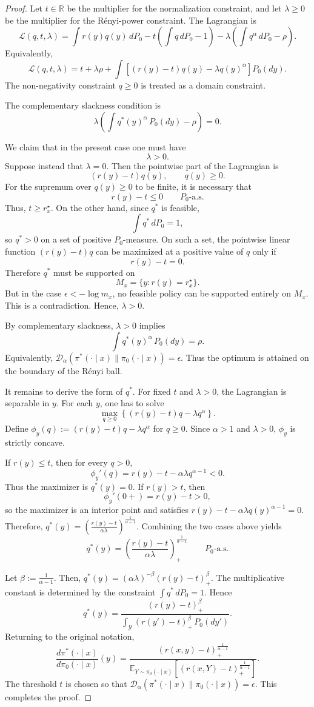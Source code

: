 \documentclass[11pt]{article}
\begin{document}
\begin{proof}
Let $t\in\mathbb R$ be the multiplier for
the normalization constraint, and let $\lambda\ge0$ be the multiplier for the
R\'enyi-power constraint. The Lagrangian is
\[
\mathcal L(q,t,\lambda)
=
\int r(y)q(y)\,dP_0
-
t\left(\int q\,dP_0-1\right)
-
\lambda\left(\int q^\alpha\,dP_0-\rho\right).
\]
Equivalently,
\[
\mathcal L(q,t,\lambda)
=
t+\lambda\rho
+
\int
\left[
(r(y)-t)q(y)-\lambda q(y)^\alpha
\right]P_0(dy).
\]
The non-negativity constraint $q\ge0$ is treated as a domain constraint.

The complementary slackness condition is
\[
\lambda
\left(
\int q^*(y)^\alpha\,P_0(dy)-\rho
\right)
=
0.
\]

We claim that in the present case one must have
\[
\lambda>0.
\]
Suppose instead that $\lambda=0$. Then the pointwise part of the Lagrangian is
\[
(r(y)-t)q(y),
\qquad q(y)\ge0.
\]
For the supremum over $q(y)\ge0$ to be finite, it is necessary that
\[
r(y)-t\le0
\qquad P_0\text{-a.s.}
\]
Thus, $t\ge r_x^\star$. On the other hand, since $q^*$ is feasible,
\[
\int q^*\,dP_0=1,
\]
so $q^*>0$ on a set of positive $P_0$-measure. On such a set, the pointwise
linear function $(r(y)-t)q$ can be maximized at a positive value of $q$ only if
\[
r(y)-t=0.
\]
Therefore $q^*$ must be supported on
\[
M_x=\{y:r(y)=r_x^\star\}.
\]
But in the case $\epsilon<-\log m_x$, no feasible policy can be supported
entirely on $M_x$. This is a contradiction. Hence, $\lambda>0$.

By complementary slackness, $\lambda>0$ implies
\[
\int q^*(y)^\alpha\,P_0(dy)=\rho.
\]
Equivalently, $\mathcal D_\alpha(\pi^*(\cdot\mid x)\|\pi_0(\cdot\mid x))
=
\epsilon$. Thus the optimum is attained on the boundary of the R\'enyi ball.

It remains to derive the form of $q^*$. For fixed $t$ and $\lambda>0$, the
Lagrangian is separable in $y$. For each $y$, one has to solve
\[
\max_{q\ge0}
\left\{
(r(y)-t)q-\lambda q^\alpha
\right\}.
\]
Define
$
\phi_y(q):=(r(y)-t)q-\lambda q^\alpha$ for $q\ge0$. Since $\alpha>1$ and $\lambda>0$, $\phi_y$ is strictly concave.

If $r(y)\le t$, then for every $q>0$,
\[
\phi_y'(q)
=
r(y)-t-\alpha\lambda q^{\alpha-1}
<0.
\]
Thus the maximizer is $
q^*(y)=0$. If $r(y)>t$, then
\[
\phi_y'(0+)=r(y)-t>0,
\]
so the maximizer is an interior point and satisfies
$
r(y)-t-\alpha\lambda q(y)^{\alpha-1}=0$. Therefore, $q^*(y)
=
\left(
\frac{r(y)-t}{\alpha\lambda}
\right)^{\frac1{\alpha-1}}$. Combining the two cases above yields
\[
q^*(y)
=
\left(
\frac{r(y)-t}{\alpha\lambda}
\right)_+^{\frac1{\alpha-1}}
\qquad P_0\text{-a.s.}
\]

Let $\beta:=\frac1{\alpha-1}$. Then,
$
q^*(y)
=
(\alpha\lambda)^{-\beta}(r(y)-t)_+^\beta$. The multiplicative constant is determined by the constraint $\int q^*\,dP_0=1$. Hence
\[
q^*(y)
=
\frac{(r(y)-t)_+^\beta}
{\int_{\mathcal Y}(r(y')-t)_+^\beta\,P_0(dy')}.
\]
Returning to the original notation,
\[
\frac{d\pi^*(\cdot\mid x)}{d\pi_0(\cdot\mid x)}(y)
=
\frac{(r(x,y)-t)_+^{\frac1{\alpha-1}}}
{\mathbb E_{Y\sim\pi_0(\cdot\mid x)}
[(r(x,Y)-t)_+^{\frac1{\alpha-1}}]}.
\]
The threshold $t$ is chosen so that $\mathcal D_\alpha(\pi^*(\cdot\mid x)\|\pi_0(\cdot\mid x))
=
\epsilon$. This completes the proof.
\end{proof}
\end{document}
